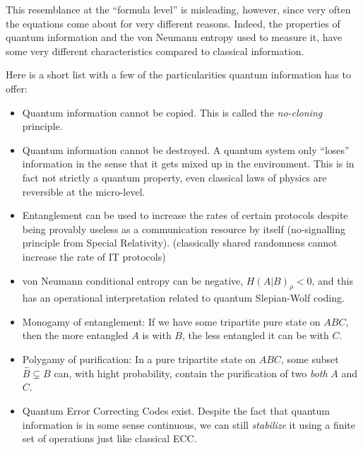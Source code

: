 \documentclass[aps,11pt,twoside,letterpaper]{article}
\begin{document}
	This resemblance at the ``formula level'' is misleading, however, since very often the equations
	come about for very different reasons.
	Indeed, the properties of quantum information and the von Neumann entropy used
	to measure it, have some very different characteristics compared to classical information.
	
	Here is a short list with a few of the particularities quantum information has to offer:
	
	\begin{itemize}
		\item 	Quantum information cannot be copied. This is called the \emph{no-cloning} principle.
		\item 	Quantum information cannot be destroyed. A quantum system only ``loses'' 
				information in the sense that it gets mixed up in the environment. 
				This is in fact not strictly a quantum property, even classical laws of physics are 
				reversible at the micro-level.
		\item 	Entanglement can be used to increase the rates of certain protocols despite being
				provably useless as a communication resource by itself (no-signalling principle from Special Relativity).
				(classically shared randomness cannot increase the rate of IT protocols)
		\item 	von Neumann conditional entropy can be negative,
				$H(A|B)_\rho < 0$, and this has an operational interpretation related to quantum Slepian-Wolf coding.
		\item 	Monogamy of entanglement:  If we have some tripartite pure state on $ABC$,
				then the more entangled $A$ is with $B$, the less entangled it can be with $C$.
		\item		Polygamy of purification: In a pure tripartite state on $ABC$, some subset $\hat{B} \subsetneq B $ can,
				with hight probability, contain the purification of two \emph{both} $A$ and $C$.
		\item		Quantum Error Correcting Codes exist. 
				Despite the fact that quantum information is in some sense continuous,
				we can still \emph{stabilize} it using a finite set of operations just like classical ECC.
	\end{itemize}	
\end{document}
